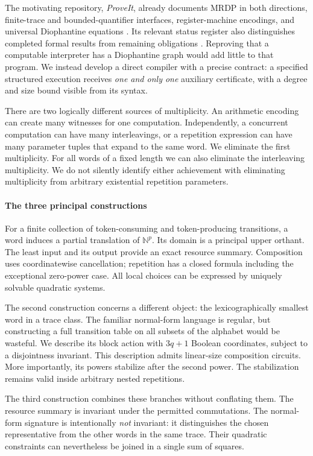 \documentclass[11pt,a4paper]{article}
\theoremstyle{definition}
\theoremstyle{remark}
\newcommand{\N}{\mathbb N}
\begin{document}
The motivating repository, \emph{ProveIt}, already documents MRDP in both
directions, finite-trace and bounded-quantifier interfaces, register-machine
encodings, and universal Diophantine equations \cite{repo}. Its relevant status register
also distinguishes completed formal results from remaining obligations
\cite{repo}. Reproving that a computable interpreter has a Diophantine graph
would add little to that program. We instead develop a direct compiler with a
precise contract: a specified structured execution receives \emph{one and only
one} auxiliary certificate, with a degree and size bound visible from its
syntax.

There are two logically different sources of multiplicity. An arithmetic
encoding can create many witnesses for one computation. Independently, a
concurrent computation can have many interleavings, or a repetition expression
can have many parameter tuples that expand to the same word. We eliminate the
first multiplicity. For all words of a fixed length we can also eliminate the
interleaving multiplicity. We do not silently identify either achievement with
eliminating multiplicity from arbitrary existential repetition parameters.

\paragraph{The three principal constructions}

For a finite collection of token-consuming and token-producing transitions, a
word induces a partial translation of $\N^p$. Its domain is a principal upper
orthant. The least input and its output provide an exact resource summary.
Composition uses coordinatewise cancellation; repetition has a closed formula
including the exceptional zero-power case. All local choices can be expressed
by uniquely solvable quadratic systems.

The second construction concerns a different object: the lexicographically
smallest word in a trace class. The familiar normal-form language is regular,
but constructing a full transition table on all subsets of the alphabet would
be wasteful. We describe its block action with $3q+1$ Boolean coordinates,
subject to a disjointness invariant. This description admits linear-size
composition circuits. More importantly, its powers stabilize after the second
power. The stabilization remains valid inside arbitrary nested repetitions.

The third construction combines these branches without conflating them. The
resource summary is invariant under the permitted commutations. The
normal-form signature is intentionally \emph{not} invariant: it distinguishes
the chosen representative from the other words in the same trace. Their
quadratic constraints can nevertheless be joined in a single sum of squares.
\end{document}
